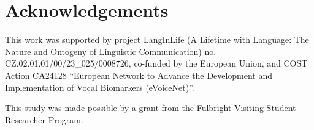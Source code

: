 \documentclass{article}
\begin{document}
{%



\newpage
\section{Acknowledgements}
\label{sec:ackn}

This work was supported by project LangInLife (A Lifetime with Language: The Nature and Ontogeny of Linguistic Communication) no. CZ.02.01.01/00/23\_025/0008726, co-funded by the European Union, and COST Action CA24128 ``European Network to Advance the Development and Implementation of Vocal Biomarkers (eVoiceNet)''.

This study was made possible by a grant from the Fulbright Visiting Student Researcher Program.

}
{
\ninept
\fontsize{9pt}{11pt}\selectfont
\setlength{\bibitemsep}{0.65\baselineskip}




}
\end{document}
